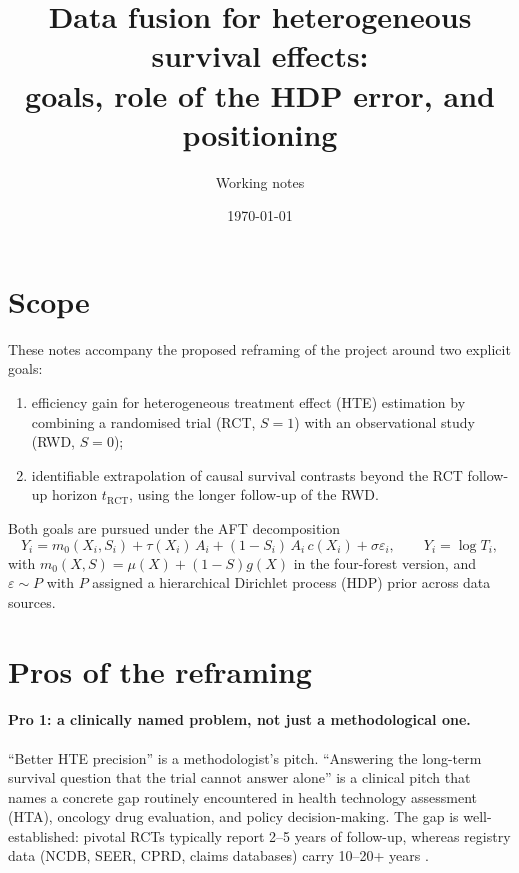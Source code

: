 \documentclass[11pt]{article}
\title{Data fusion for heterogeneous survival effects:\\
goals, role of the HDP error, and positioning}
\author{Working notes}
\date{\today}
\newcommand{\X}{X}
\newcommand{\A}{A}
\newcommand{\Sx}{S}
\newcommand{\tauf}{\tau}
\newcommand{\cf}{c}
\newcommand{\gf}{g}
\newcommand{\muf}{\mu}
\newcommand{\mzero}{m_{0}}
\newcommand{\RCT}{\mathrm{RCT}}
\begin{document}
\maketitle

\section*{Scope}

These notes accompany the proposed reframing of the project around two
explicit goals:
\begin{enumerate}[label=(G\arabic*),leftmargin=*]
  \item efficiency gain for heterogeneous treatment effect (HTE) estimation by
        combining a randomised trial (RCT, $\Sx=1$) with an observational
        study (RWD, $\Sx=0$);
  \item identifiable extrapolation of causal survival contrasts beyond the
        RCT follow-up horizon $t_{\RCT}$, using the longer follow-up of the RWD.
\end{enumerate}
Both goals are pursued under the AFT decomposition
\begin{equation}
  Y_i = \mzero(\X_i, \Sx_i) + \tauf(\X_i)\,\A_i
        + (1-\Sx_i)\,\A_i\,\cf(\X_i) + \sigma\varepsilon_i,
  \qquad Y_i = \log T_i,
  \label{eq:decomp}
\end{equation}
with $\mzero(\X,\Sx) = \muf(\X) + (1-\Sx)\gf(\X)$ in the four-forest version,
and $\varepsilon \sim P$ with $P$ assigned a hierarchical Dirichlet process
(HDP) prior across data sources.

\section{Pros of the reframing}

\paragraph{Pro 1: a clinically named problem, not just a methodological one.}
``Better HTE precision'' is a methodologist's pitch. ``Answering the long-term
survival question that the trial cannot answer alone'' is a clinical pitch
that names a concrete gap routinely encountered in health technology
assessment (HTA), oncology drug evaluation, and policy decision-making. The
gap is well-established: pivotal RCTs typically report 2--5 years of
follow-up, whereas registry data (NCDB, SEER, CPRD, claims databases) carry
10--20+ years \citep{Latimer2013, Jackson2023, Guyot2017}.
\end{document}
